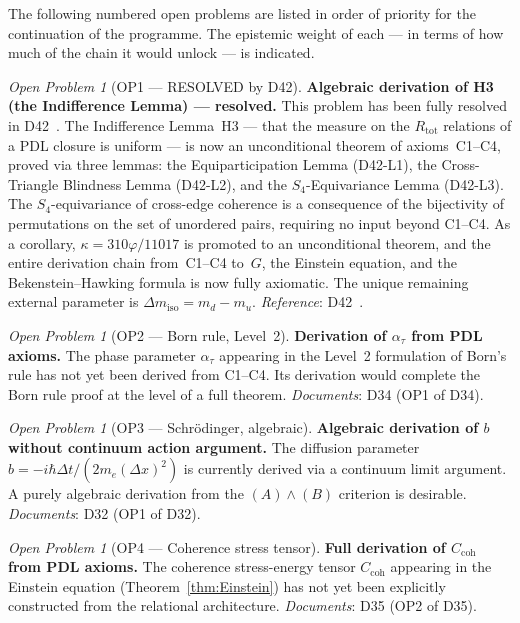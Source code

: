 \documentclass[11pt,a4paper]{article}
\theoremstyle{plain}
\theoremstyle{definition}
\theoremstyle{remark}
\newtheorem{openproblem}[theorem]{Open Problem}
\newcommand{\Rtot}{R_{\mathrm{tot}}}
\begin{document}
The following numbered open problems are listed in order of priority for the continuation of the programme.
The epistemic weight of each — in terms of how much of the chain it would unlock — is indicated.

\begin{openproblem}[OP1 — \textcolor{proofblue}{RESOLVED by D42}]
\label{op:H3}
\textbf{Algebraic derivation of H3 (the Indifference Lemma) — resolved.}
This problem has been fully resolved in D42~\citep{D42}. The Indifference Lemma~H3 --- that the measure on the $\Rtot$ relations of a PDL closure is uniform --- is now an unconditional theorem of axioms~C1--C4, proved via three lemmas: the Equiparticipation Lemma (D42-L1), the Cross-Triangle Blindness Lemma (D42-L2), and the $S_4$-Equivariance Lemma (D42-L3). The $S_4$-equivariance of cross-edge coherence is a consequence of the bijectivity of permutations on the set of unordered pairs, requiring no input beyond C1--C4. As a corollary, $\kappa = 310\varphi/11017$ is promoted to an unconditional theorem, and the entire derivation chain from~C1--C4 to~$G$, the Einstein equation, and the Bekenstein--Hawking formula is now fully axiomatic. The unique remaining external parameter is $\Delta m_{\mathrm{iso}} = m_d - m_u$.
\emph{Reference}: D42~\citep{D42}.
\end{openproblem}

\begin{openproblem}[OP2 — Born rule, Level~2]
\label{op:born_level2}
\textbf{Derivation of $\alpha_\tau$ from PDL axioms.}
The phase parameter $\alpha_\tau$ appearing in the Level~2 formulation of Born's rule has not yet been derived from C1--C4.
Its derivation would complete the Born rule proof at the level of a full theorem.
\emph{Documents}: D34 (OP1 of D34).
\end{openproblem}

\begin{openproblem}[OP3 — Schr\"odinger, algebraic]
\label{op:schrodinger_b}
\textbf{Algebraic derivation of $b$ without continuum action argument.}
The diffusion parameter $b=-i\hbar\Delta t/(2m_e(\Delta x)^2)$ is currently derived via a continuum limit argument.
A purely algebraic derivation from the $(A)\wedge(B)$ criterion is desirable.
\emph{Documents}: D32 (OP1 of D32).
\end{openproblem}

\begin{openproblem}[OP4 — Coherence stress tensor]
\label{op:Ccoh}
\textbf{Full derivation of $C_{\mathrm{coh}}$ from PDL axioms.}
The coherence stress-energy tensor $C_{\mathrm{coh}}$ appearing in the Einstein equation (Theorem~\ref{thm:Einstein}) has not yet been explicitly constructed from the relational architecture.
\emph{Documents}: D35 (OP2 of D35).
\end{openproblem}
\end{document}
